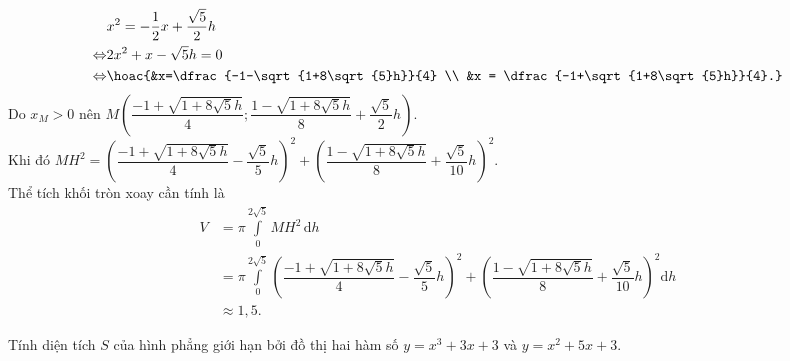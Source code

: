 \begin{bt}
{\begin{align*}
			&x^2 = -\dfrac{1}{2}x + \dfrac{\sqrt{5}}{2}h \\
			\Leftrightarrow&2x^2 + x - \sqrt{5}h = 0 \\
			\Leftrightarrow& \hoac{&x=\dfrac{-1-\sqrt{1+8\sqrt{5}h}}{4} \\ &x = \dfrac{-1+\sqrt{1+8\sqrt{5}h}}{4}.}
		\end{align*}
		Do $x_M>0$ nên $M\left(\dfrac{-1+\sqrt{1+8\sqrt{5}h}}{4};\dfrac{1-\sqrt{1+8\sqrt{5}h}}{8}+\dfrac{\sqrt{5}}{2}h\right)$. \\
		Khi đó $MH^2 = \left(\dfrac{-1+\sqrt{1+8\sqrt{5}h}}{4}-\dfrac{\sqrt{5}}{5}h\right)^2 + \left(\dfrac{1-\sqrt{1+8\sqrt{5}h}}{8}+\dfrac{\sqrt{5}}{10}h\right)^2$. \\
		Thể tích khối tròn xoay cần tính là
		\allowdisplaybreaks
		\begin{align*}
			V &= \displaystyle \pi\int\limits_{0}^{2\sqrt{5}}MH^2\mathrm{\,d}h \\
			&= \displaystyle \pi\int\limits_{0}^{2\sqrt{5}}\left(\dfrac{-1+\sqrt{1+8\sqrt{5}h}}{4}-\dfrac{\sqrt{5}}{5}h\right)^2 + \left(\dfrac{1-\sqrt{1+8\sqrt{5}h}}{8}+\dfrac{\sqrt{5}}{10}h\right)^2\mathrm{d}h \\
			&\approx 1{,}5.
		\end{align*}
	}
\end{bt}

\begin{bt}%
	Tính diện tích $S$ của hình phẳng giới hạn bởi đồ thị hai hàm số $y=x^3 +3x+3$ và $y=x^2+5x+3$.
\end{bt}

